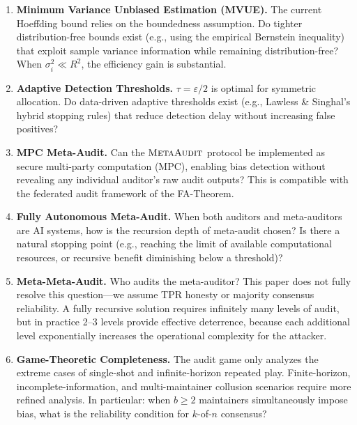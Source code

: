 \documentclass[11pt,a4paper]{article}
\theoremstyle{definition}
\newcommand{\MetaAudit}{\textsc{MetaAudit}}
\begin{document}
\begin{enumerate}[leftmargin=*, label=\textbf{OP\arabic*}]
    \item \textbf{Minimum Variance Unbiased Estimation (MVUE).} The current Hoeffding bound relies on the boundedness assumption. Do tighter distribution-free bounds exist (e.g., using the empirical Bernstein inequality) that exploit sample variance information while remaining distribution-free? When $\sigma_i^2 \ll R^2$, the efficiency gain is substantial.
    
    \item \textbf{Adaptive Detection Thresholds.} $\tau = \varepsilon/2$ is optimal for symmetric allocation. Do data-driven adaptive thresholds exist (e.g., Lawless \& Singhal's hybrid stopping rules) that reduce detection delay without increasing false positives?
    
    \item \textbf{MPC Meta-Audit.} Can the $\MetaAudit$ protocol be implemented as secure multi-party computation (MPC), enabling bias detection without revealing any individual auditor's raw audit outputs? This is compatible with the federated audit framework of the FA-Theorem.
    
    \item \textbf{Fully Autonomous Meta-Audit.} When both auditors and meta-auditors are AI systems, how is the recursion depth of meta-audit chosen? Is there a natural stopping point (e.g., reaching the limit of available computational resources, or recursive benefit diminishing below a threshold)?
    
    \item \textbf{Meta-Meta-Audit.} Who audits the meta-auditor? This paper does not fully resolve this question---we assume TPR honesty or majority consensus reliability. A fully recursive solution requires infinitely many levels of audit, but in practice 2--3 levels provide effective deterrence, because each additional level exponentially increases the operational complexity for the attacker.
    
    \item \textbf{Game-Theoretic Completeness.} The audit game  only analyzes the extreme cases of single-shot and infinite-horizon repeated play. Finite-horizon, incomplete-information, and multi-maintainer collusion scenarios require more refined analysis. In particular: when $b \geq 2$ maintainers simultaneously impose bias, what is the reliability condition for $k$-of-$n$ consensus?
\end{enumerate}
\end{document}

